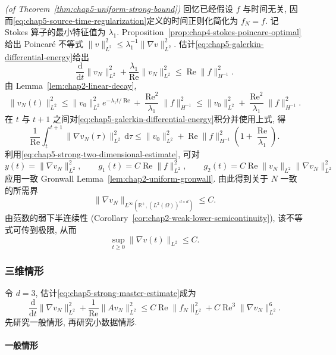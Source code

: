 \begin{Proof}
\textit{(of Theorem~\ref{thm:chap5-uniform-strong-bound})}\quad
回忆已经假设 $f$ 与时间无关, 因而\eqref{eq:chap5-source-time-regularization}定义的时间正则化简化为 $f_N=f$. 记 Stokes 算子的最小特征值为 $\lambda_1$. Proposition~\ref{prop:chap4-stokes-poincare-optimal}给出 Poincaré 不等式 $\|v\|_{L^2}^2\leq\lambda_1^{-1}\|\nabla v\|_{L^2}^2$. 估计\eqref{eq:chap5-galerkin-differential-energy}给出
\[
 \frac{\mathrm d}{\mathrm dt}\|v_N\|_{L^2}^2
 +\frac{\lambda_1}{\operatorname{Re}}\|v_N\|_{L^2}^2
 \leq\operatorname{Re}\|f\|_{H^{-1}}^2.
\]
由 Lemma~\ref{lem:chap2-linear-decay},
\[
 \|v_N(t)\|_{L^2}^2
 \leq\|v_0\|_{L^2}^2e^{-\lambda_1t/\operatorname{Re}}
 +\frac{\operatorname{Re}^2}{\lambda_1}\|f\|_{H^{-1}}^2
 \leq\|v_0\|_{L^2}^2+\frac{\operatorname{Re}^2}{\lambda_1}\|f\|_{H^{-1}}^2.
\]
在 $t$ 与 $t+1$ 之间对\eqref{eq:chap5-galerkin-differential-energy}积分并使用上式, 得
\[
 \frac1{\operatorname{Re}}\int_t^{t+1}\|\nabla v_N(\tau)\|_{L^2}^2\,\mathrm d\tau
 \leq\|v_0\|_{L^2}^2
 +\operatorname{Re}\|f\|_{H^{-1}}^2\left(1+\frac{\operatorname{Re}}{\lambda_1}\right).
\]
利用\eqref{eq:chap5-strong-two-dimensional-estimate}, 可对
\[
 y(t)=\|\nabla v_N\|_{L^2}^2,
 \qquad g_1(t)=C\operatorname{Re}\|f\|_{L^2}^2,
 \qquad g_2(t)=C\operatorname{Re}\|v_N\|_{L^2}\|\nabla v_N\|_{L^2}^2
\]
应用一致 Gronwall Lemma~\ref{lem:chap2-uniform-gronwall}. 由此得到关于 $N$ 一致的所需界
\[
 \|\nabla v_N\|_{L^\infty(\mathbb R^+,(L^2(\Omega))^{d\times d})}\leq C.
\]
由范数的弱下半连续性 (Corollary~\ref{cor:chap2-weak-lower-semicontinuity}), 该不等式可传到极限, 从而
\[
 \sup_{t\geq0}\|\nabla v(t)\|_{L^2}\leq C.
\]
\end{Proof}

\subsubsection{三维情形}
\label{subsec:chap5-strong-three-dimensional}

令 $d=3$, 估计\eqref{eq:chap5-strong-master-estimate}成为
\begin{equation}
 \frac{\mathrm d}{\mathrm dt}\|\nabla v_N\|_{L^2}^2
 +\frac1{\operatorname{Re}}\|Av_N\|_{L^2}^2
 \leq C\operatorname{Re}\|f_N\|_{L^2}^2
 +C\operatorname{Re}^3\|\nabla v_N\|_{L^2}^6.
\label{eq:chap5-strong-three-dimensional-estimate}
\end{equation}
先研究一般情形, 再研究小数据情形.

\paragraph{一般情形}
\label{subsec:chap5-strong-three-dimensional-general}

